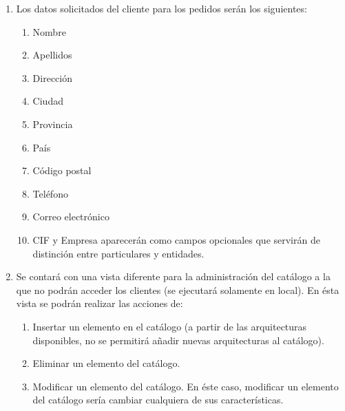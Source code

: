 \begin{enumerate}
\item Los datos solicitados del cliente para los pedidos serán los siguientes:

	\begin{enumerate}
		\item Nombre 
		\item Apellidos
	    \item Dirección
	    \item Ciudad
	    \item Provincia
	    \item País
	    \item Código postal
	    \item Teléfono
	    \item Correo electrónico
	    \item CIF y Empresa aparecerán como campos opcionales que servirán de distinción entre particulares y entidades.
	\end{enumerate}
	

\item Se contará con una vista diferente para la administración del catálogo a la que no podrán acceder los clientes (se ejecutará solamente en local). 
En ésta vista se podrán realizar las acciones de:
	
	\begin{enumerate}
    	\item Insertar un elemento en el catálogo (a partir de las
           arquitecturas disponibles, no se permitirá añadir nuevas
           arquitecturas al catálogo).  
		\item Eliminar un elemento del catálogo.
        \item Modificar un elemento del catálogo. En éste caso, modificar un elemento del catálogo sería cambiar cualquiera de sus características.
    \end{enumerate}   
\end{enumerate}
